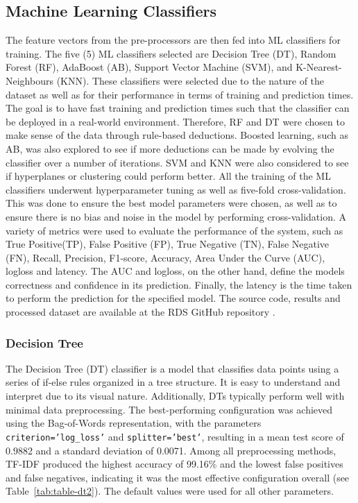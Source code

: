 \documentclass[conference]{IEEEtran}
\begin{document}
\subsection{Machine Learning Classifiers}
The feature vectors from the pre-processors are then fed into ML classifiers for training. The five (5) ML classifiers selected are Decision Tree (DT), Random Forest (RF), AdaBoost (AB), Support Vector Machine (SVM), and K-Nearest-Neighbours (KNN). These classifiers were selected due to the nature of the dataset as well as for their performance in terms of training and prediction times. The goal is to have fast training and prediction times such that the classifier can be deployed in a real-world environment. Therefore, RF and DT were chosen to make sense of the data through rule-based deductions. Boosted learning, such as AB, was also explored to see if more deductions can be made by evolving the classifier over a number of iterations. SVM and KNN were also considered to see if hyperplanes or clustering could perform better. All the training of the ML classifiers underwent hyperparameter tuning as well as five-fold cross-validation. This was done to ensure the best model parameters were chosen, as well as to ensure there is no bias and noise in the model by performing cross-validation. A variety of metrics were used to evaluate the performance of the system, such as True Positive(TP), False Positive (FP), True Negative (TN), False Negative (FN), Recall, Precision, F1-score, Accuracy, Area Under the Curve (AUC), logloss and latency. The AUC and logloss, on the other hand, define the models correctness and confidence in its prediction. Finally, the latency is the time taken to perform the prediction for the specified model. The source code, results and processed dataset are available at the RDS GitHub repository \cite{Daneel2022}.  \\

\subsubsection{Decision Tree}
The Decision Tree (DT) classifier is a model that classifies data points using a series of if-else rules organized in a tree structure. It is easy to understand and interpret due to its visual nature. Additionally, DTs typically perform well with minimal data preprocessing. The best-performing configuration was achieved using the Bag-of-Words representation, with the parameters \texttt{criterion='log\_loss'} and \texttt{splitter='best'}, resulting in a mean test score of 0.9882 and a standard deviation of 0.0071. Among all preprocessing methods, TF-IDF produced the highest accuracy of 99.16\% and the lowest false positives and false negatives, indicating it was the most effective configuration overall (see Table~\ref{tab:table-dt2}). The default values were used for all other parameters.
\end{document}
